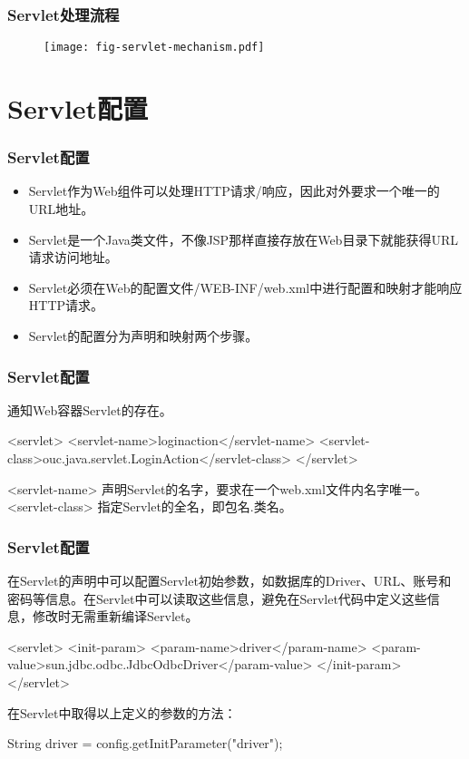 \begin{frame}[fragile] %
\frametitle{Servlet处理流程} 
\begin{figure}
\centering
\texttt{[image: fig-servlet-mechanism.pdf]}
\end{figure}
\end{frame}

\section{Servlet配置}

\begin{frame}[fragile] %
\frametitle{Servlet配置}
\begin{itemize}
\item Servlet作为Web组件可以处理HTTP请求/响应，因此对外要求一个唯一的URL地址。
\item Servlet是一个Java类文件，不像JSP那样直接存放在Web目录下就能获得URL请求访问地址。
\item Servlet必须在Web的配置文件{\Red /WEB-INF/web.xml}中进行配置和映射才能响应HTTP请求。
\item Servlet的配置分为{\hei 声明和映射}两个步骤。
\end{itemize}
\end{frame}

\begin{frame}[fragile] %
\frametitle{Servlet配置}

通知Web容器Servlet的存在。

\begin{xmlCode}
<servlet>
  <servlet-name>loginaction</servlet-name>
  <servlet-class>ouc.java.servlet.LoginAction</servlet-class>
</servlet>  
\end{xmlCode}

<servlet-name> 声明Servlet的名字，要求在一个web.xml文件内名字唯一。\\
<servlet-class> 指定Servlet的全名，即包名.类名。\\
\end{frame}

\begin{frame}[fragile] %
\frametitle{Servlet配置}

在Servlet的声明中可以配置Servlet初始参数，如数据库的Driver、URL、账号和
密码等信息。在Servlet中可以读取这些信息，避免在Servlet代码中定义这些信
息，修改时无需重新编译Servlet。

\begin{xmlCode}
<servlet>
  <init-param>
    <param-name>driver</param-name>
    <param-value>sun.jdbc.odbc.JdbcOdbcDriver</param-value>
  </init-param>
</servlet>
\end{xmlCode}

在Servlet中取得以上定义的参数的方法：

\begin{javaCode}
String driver = config.getInitParameter("driver");
\end{javaCode}
\end{frame}

